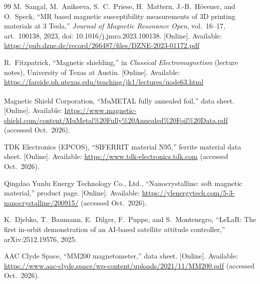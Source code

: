 \documentclass[12pt,a4paper]{article}
\begin{document}
\begin{thebibliography}{99}
M.\ Sangal, M.\ Anikeeva, S.\ C.\ Priese, H.\ Mattern, J.-B.\ H\"ovener, and O.\ Speck, ``MR based magnetic susceptibility measurements of 3D printing materials at 3 Tesla,'' \emph{Journal of Magnetic Resonance Open}, vol.~16--17, art.~100138, 2023, doi: 10.1016/j.jmro.2023.100138. [Online]. Available: \url{https://pub.dzne.de/record/266487/files/DZNE-2023-01172.pdf}

R.\ Fitzpatrick, ``Magnetic shielding,'' in \emph{Classical Electromagnetism} (lecture notes), University of Texas at Austin. [Online]. Available: \url{https://farside.ph.utexas.edu/teaching/jk1/lectures/node63.html}

Magnetic Shield Corporation, ``MuMETAL\textsuperscript{\textregistered} fully annealed foil,'' data sheet. [Online]. Available: \url{https://www.magnetic-shield.com/content/MuMetal%20Fully%20Annealed%20Foil%20Data.pdf} (accessed Oct.\ 2026).

TDK Electronics (EPCOS), ``SIFERRIT material N95,'' ferrite material data sheet. [Online]. Available: \url{https://www.tdk-electronics.tdk.com} (accessed Oct.\ 2026).

Qingdao Yunlu Energy Technology Co., Ltd., ``Nanocrystalline: soft magnetic material,'' product page. [Online]. Available: \url{https://ylenergytech.com/5-3-nanocrystalline/200915/} (accessed Oct.\ 2026).

K.\ Djebko, T.\ Baumann, E.\ Dilger, F.\ Puppe, and S.\ Montenegro, ``LeLaR: The first in-orbit demonstration of an AI-based satellite attitude controller,'' arXiv:2512.19576, 2025.

AAC Clyde Space, ``MM200 magnetometer,'' data sheet. [Online]. Available: \url{https://www.aac-clyde.space/wp-content/uploads/2021/11/MM200.pdf} (accessed Oct.\ 2026).

\end{thebibliography}
\end{document}
